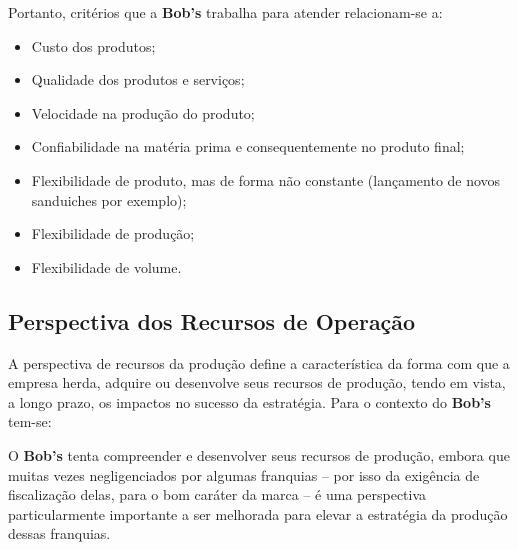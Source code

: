 			Portanto, critérios que a \textbf{Bob’s} trabalha para atender relacionam-se a:

			\begin{itemize}
				\item{Custo dos produtos;}
				\item{Qualidade dos produtos e serviços;}
				\item{Velocidade na produção do produto;}
				\item{Confiabilidade na matéria prima e consequentemente no produto final;}
				\item{Flexibilidade de produto, mas de forma não constante (lançamento de novos sanduiches por exemplo);}
				\item{Flexibilidade de produção;}
				\item{Flexibilidade de volume.}
			\end{itemize}


		\subsection[Perspectiva dos Recursos de Operação]{Perspectiva dos Recursos de Operação}
		\label{sec:dados_perspOeste}

			A perspectiva de recursos da produção define a característica da forma com que a empresa herda, adquire ou desenvolve seus recursos de produção, tendo em vista, a longo prazo, os impactos no sucesso da estratégia. Para o contexto do \textbf{Bob’s} tem-se:

			O \textbf{Bob’s} tenta compreender e desenvolver seus recursos de produção, embora que muitas vezes negligenciados por algumas franquias – por isso da exigência de fiscalização delas, para o bom caráter da marca – é uma perspectiva particularmente importante a ser melhorada para elevar a estratégia da produção dessas franquias. \cite{lamonica}